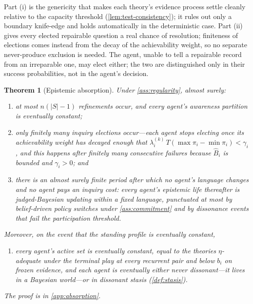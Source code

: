 \documentclass[11pt]{article}
\newtheorem{theorem}[assumption]{Theorem}
\theoremstyle{definition}
\begin{document}
Part (i) is the genericity that makes each theory's evidence process settle cleanly relative to the capacity threshold (\cref{lem:test-consistency}); it rules out only a boundary knife-edge and holds automatically in the deterministic case.
Part (ii) gives every elected repairable question a real chance of resolution; finiteness of elections comes instead from the decay of the achievability weight, so no separate never-produce exclusion is needed.
The agent, unable to tell a repairable record from an irreparable one, may elect either; the two are distinguished only in their success probabilities, not in the agent's decision.

\begin{theorem}[Epistemic absorption]
\label{thm:absorption}
Under \cref{ass:regularity}, almost surely:
\begin{enumerate}[label=(\alph*)]
  \item at most $n(|S|-1)$ refinements occur, and every agent's awareness partition is eventually constant;
  \item only finitely many inquiry elections occur---each agent stops electing once its achievability weight has decayed enough that $\lambda_i^{(k)}\,T(\max \pi_i-\min \pi_i)<\gamma_i$, and this happens after finitely many consecutive failures because $\widehat B_i$ is bounded and $\gamma_i>0$; and
  \item there is an almost surely finite period after which no agent's language changes and no agent pays an inquiry cost: every agent's epistemic life thereafter is judged-Bayesian updating within a fixed language, punctuated at most by belief-driven policy switches under \cref{ass:commitment} and by dissonance events that fail the participation threshold.
\end{enumerate}
Moreover, on the event that the standing profile is eventually constant,
\begin{enumerate}[label=(\alph*),start=4]
  \item every agent's active set is eventually constant, equal to the theories $\eta$-adequate under the terminal play at every recurrent pair and below $b_i$ on frozen evidence, and each agent is eventually either never dissonant---it lives in a Bayesian world---or in dissonant stasis (\cref{def:stasis}).
\end{enumerate}
The proof is in \cref{app:absorption}.
\end{theorem}
\end{document}
